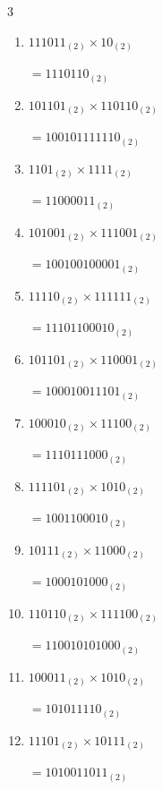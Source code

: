 \begin{multicols}{3}
\begin{enumerate}
        $=1000000001_{(2)}$

\columnbreak %

  \item $111011_{(2)} \times 10_{(2)}$

        $=1110110_{(2)}$

  \item $101101_{(2)} \times 110110_{(2)}$

        $=100101111110_{(2)}$

  \item $1101_{(2)} \times 1111_{(2)}$

        $=11000011_{(2)}$

  \item $101001_{(2)} \times 111001_{(2)}$

        $=100100100001_{(2)}$

  \item $11110_{(2)} \times 111111_{(2)}$

        $=11101100010_{(2)}$

\columnbreak %

  \item $101101_{(2)} \times 110001_{(2)}$

        $=100010011101_{(2)}$

  \item $100010_{(2)} \times 11100_{(2)}$

        $=1110111000_{(2)}$

  \item $111101_{(2)} \times 1010_{(2)}$

        $=1001100010_{(2)}$

  \item $10111_{(2)} \times 11000_{(2)}$

        $=1000101000_{(2)}$

  \item $110110_{(2)} \times 111100_{(2)}$

        $=110010101000_{(2)}$

\columnbreak %

\resetques

  \item $100011_{(2)} \times 1010_{(2)}$

        $=101011110_{(2)}$

  \item $11101_{(2)} \times 10111_{(2)}$

        $=1010011011_{(2)}$


\end{enumerate}
\end{multicols}
